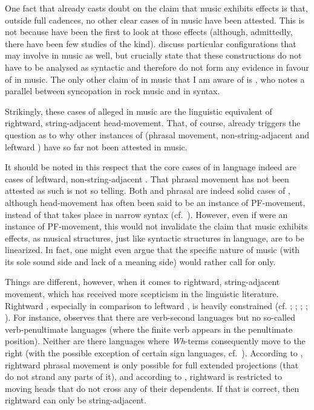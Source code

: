 \documentclass[output=paper]{langsci/langscibook}
\begin{document}
One fact that already casts doubt on the claim that music exhibits 
effects is that, outside full cadences, no other clear cases of  in
music have been attested. This is not because \citeauthor{KatzPes2011} have
been the first to look at those effects (although, admittedly, there have been
few studies of the kind). \citet{RohrmeierNeuwirth2014} discuss particular
configurations that may involve  in music as well, but crucially state
that these constructions do not have to be analysed as syntactic  and
therefore do not form any evidence in favour of  in music. The only
other claim of  in music that I am aware of is \citet{Temperley1999},
who notes a parallel between syncopation in rock music and  in
syntax.

Strikingly, these cases of alleged  in music are the linguistic
equivalent of rightward, string-adjacent head-movement. That, of course,
already triggers the question as to why other instances of  (phrasal
movement, non-string-adjacent  and leftward ) have so far not
been attested in music.

It should be noted in this respect that the core cases of  in language
indeed are cases of leftward, non-string-adjacent . That phrasal
movement has not been attested as such is not so telling. Both 
and phrasal  are indeed solid cases of , although head-movement
has often been said to be an instance of PF-movement, instead of  that
takes place in narrow syntax (cf.\ \citealt{Chomsky1995,boeckxstjepanovic,Harley2004}). However, even if  were an instance of
PF-movement, this would not invalidate the claim that music exhibits 
effects, as musical structures, just like syntactic structures in language, are
to be linearized. In fact, one might even argue that the specific nature of
music (with its sole sound side and lack of a meaning side) would rather call
for  only.

Things are different, however, when it comes to rightward, string-adjacent
movement, which has received more scepticism in the linguistic literature.
Rightward , especially in comparison to leftward , is heavily
constrained (cf. \citealt{Ross1967}; \citealt{Kayne1994}; \citealt{Cinque1996};
\citealt{AckNee2002}; \citealt{AbeNee2012}). For instance, \citet{Kayne1994}
observes that there are verb-second languages but no so-called verb-penultimate
languages (where the finite verb appears in the penultimate position). Neither
are there languages where \emph{Wh}{}-terms consequently move to the right
(with the possible exception of certain sign languages, cf.\
\citealt{CecGerZuc2009}). According to \citet{AbeNee2012}, rightward phrasal
movement is only possible for full extended projections (that do not strand any
parts of it), and according to \citet{AckNee2002}, rightward  is
restricted to moving heads that do not cross any of their dependents. If that
is correct, then rightward \isi{head movement} can only be string-adjacent.
\end{document}

